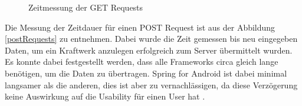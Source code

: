 \begin{figure} [ht]
	\centering
	 \qquad
	 \qquad
	 \qquad
	\caption{Zeitmessung der GET Requests} 
	\label{getRequests}
\end{figure} 

\newpage
Die Messung der Zeitdauer für einen POST Request ist aus der Abbildung \ref{postRequests} zu entnehmen. Dabei wurde die Zeit gemessen bis neu eingegeben Daten, um ein Kraftwerk anzulegen erfolgreich zum Server übermittelt wurden. Es konnte dabei festgestellt werden, dass alle Frameworks circa gleich lange benötigen, um die Daten zu übertragen. Spring for Android ist dabei minimal langsamer als die anderen, dies ist aber zu vernachlässigen, da diese Verzögerung keine Auswirkung auf die Usability für einen User hat \cite{meyer:performance}.

